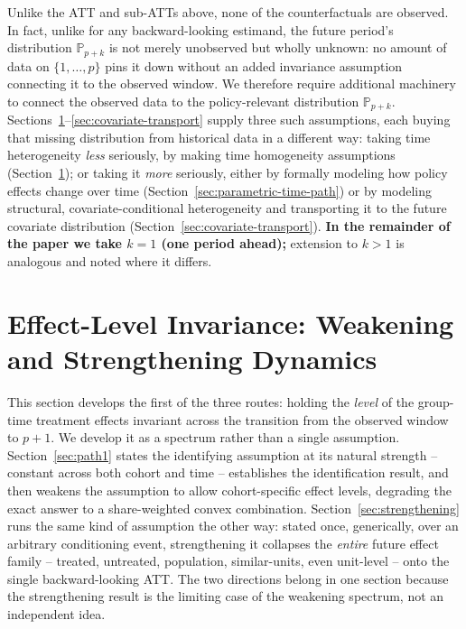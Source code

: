 \documentclass{article}
\renewcommand{\P}{\mathbb{P}}
\begin{document}
Unlike the ATT and sub-ATTs above, none of the counterfactuals are observed. In fact, unlike for any backward-looking estimand, the future period's distribution $\P_{p+k}$ is not merely unobserved but wholly unknown: no amount of data on $\{1,\ldots,p\}$ pins it down without an added invariance assumption connecting it to the observed window. We therefore require additional machinery to connect the observed data to the policy-relevant distribution $\P_{p+k}$. Sections~\ref{sec:effect-level-invariance}--\ref{sec:covariate-transport} supply three such assumptions, each buying that missing distribution from historical data in a different way: taking time heterogeneity \textit{less} seriously, by making time homogeneity assumptions (Section~\ref{sec:effect-level-invariance}); or taking it \textit{more} seriously, either by formally modeling how policy effects change over time (Section~\ref{sec:parametric-time-path}) or by modeling structural, covariate-conditional heterogeneity and transporting it to the future covariate distribution (Section~\ref{sec:covariate-transport}). \textbf{In the remainder of the paper we take $k=1$ (one period ahead);} extension to $k > 1$ is analogous and noted where it differs.

\section{Effect-Level Invariance: Weakening and Strengthening Dynamics}\label{sec:effect-level-invariance}

This section develops the first of the three routes: holding the \emph{level} of the group-time treatment effects invariant across the transition from the observed window to $p+1$. We develop it as a spectrum rather than a single assumption. Section~\ref{sec:path1} states the identifying assumption at its natural strength -- constant across both cohort and time -- establishes the identification result, and then weakens the assumption to allow cohort-specific effect levels, degrading the exact answer to a share-weighted convex combination. Section~\ref{sec:strengthening} runs the same kind of assumption the other way: stated once, generically, over an arbitrary conditioning event, strengthening it collapses the \emph{entire} future effect family -- treated, untreated, population, similar-units, even unit-level -- onto the single backward-looking ATT. The two directions belong in one section because the strengthening result is the limiting case of the weakening spectrum, not an independent idea.
\end{document}
